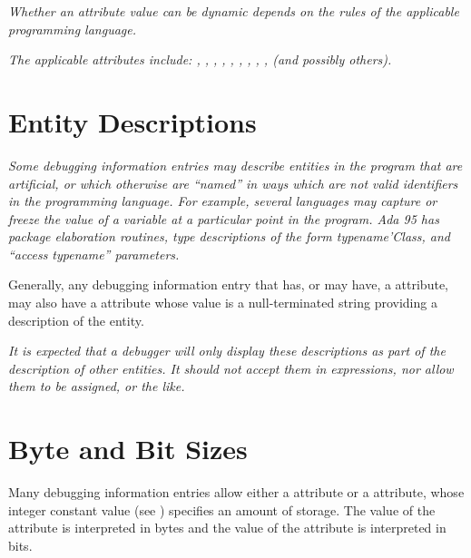 \textit{
Whether an attribute value can be dynamic depends on the
rules of the applicable programming language.
}

\textit{The applicable attributes include: 
,
, 
, 
,
, 
, 
,
, 
, 
 (and
possibly others).}


\section{Entity Descriptions}
\textit{Some debugging information entries may describe entities
in the program that are artificial, or which otherwise are
``named'' in ways which are not valid identifiers in the
programming language. For example, several languages may
capture or freeze the value of a variable at a particular
point in the program. Ada 95 has package elaboration routines,
type descriptions of the form typename’Class, and 
``access typename'' parameters.  }

Generally, any debugging information
entry that has, or may have, a  attribute, may
also have a  attribute whose value is a
null-terminated string providing a description of the entity.


\textit{It is expected that a debugger will only display these
descriptions as part of the description of other entities. It
should not accept them in expressions, nor allow them to be
assigned, or the like.}

\section{Byte and Bit Sizes}
\label{chap:byteandbitsizes}
Many debugging information entries allow either a
 attribute or a  attribute,
whose integer constant value 
(see ) 
specifies an
amount of storage. The value of the  attribute
is interpreted in bytes and the value of the 
attribute is interpreted in bits.  

